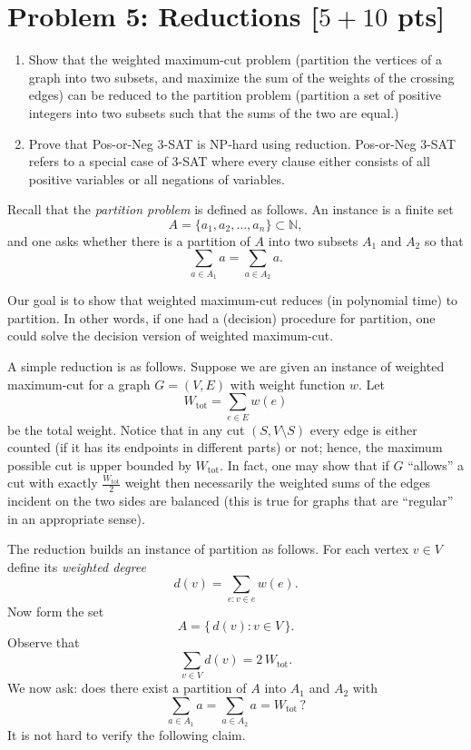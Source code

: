 \documentclass[letterpaper, 11pt]{article}
\newcommand{\1}{\mathds{1}}	%
\theoremstyle{definition}
\newcommand{\problem}[1]{\section*{Problem #1}}
\newenvironment{solution}{{\par\noindent\it Solution.}}{}
\begin{document}
\problem{5: Reductions [$5 + 10$ pts]}
\begin{enumerate}
    \item Show that the weighted maximum-cut problem (partition the vertices of a graph into two subsets, and maximize the sum of the weights of the crossing edges) can be reduced to the partition problem (partition a set of positive integers into two subsets such that the sums of the two are equal.)

    \item Prove that Pos-or-Neg 3-SAT is NP-hard using reduction. Pos-or-Neg 3-SAT refers to a special case of 3-SAT where every clause either consists of all positive variables or all negations of variables.
\end{enumerate}
\begin{solution}
Recall that the \emph{partition problem} is defined as follows. An instance is a finite set 
\[
A=\{a_1,a_2,\dots,a_n\} \subset \mathbb{N},
\]
and one asks whether there is a partition of $A$ into two subsets $A_1$ and $A_2$ so that
\[
\sum_{a \in A_1} a = \sum_{a \in A_2}a.
\]

Our goal is to show that weighted maximum-cut reduces (in polynomial time) to partition. In other words, if one had a (decision) procedure for partition, one could solve the decision version of weighted maximum-cut.

A simple reduction is as follows. Suppose we are given an instance of weighted maximum-cut for a graph $G=(V,E)$ with weight function $w$. Let 
\[
W_{\text{tot}} = \sum_{e\in E} w(e)
\]
be the total weight. Notice that in any cut $(S,V\setminus S)$ every edge is either counted (if it has its endpoints in different parts) or not; hence, the maximum possible cut is upper bounded by $W_{\text{tot}}$. In fact, one may show that if $G$ “allows” a cut with exactly \(\frac{W_{\text{tot}}}{2}\) weight then necessarily the weighted sums of the edges incident on the two sides are balanced (this is true for graphs that are “regular” in an appropriate sense).

The reduction builds an instance of partition as follows. For each vertex \(v\in V\) define its \emph{weighted degree}
\[
d(v) = \sum_{e: v\in e} w(e).
\]
Now form the set
\[
A = \{\, d(v) : v\in V \,\}.
\]
Observe that
\[
\sum_{v\in V} d(v)=2\,W_{\text{tot}}.
\]
We now ask: does there exist a partition of $A$ into $A_1$ and $A_2$ with
\[
\sum_{a\in A_1} a = \sum_{a\in A_2}a = W_{\text{tot}}\, ?
\]
It is not hard to verify the following claim.


\end{solution}
\end{document}
